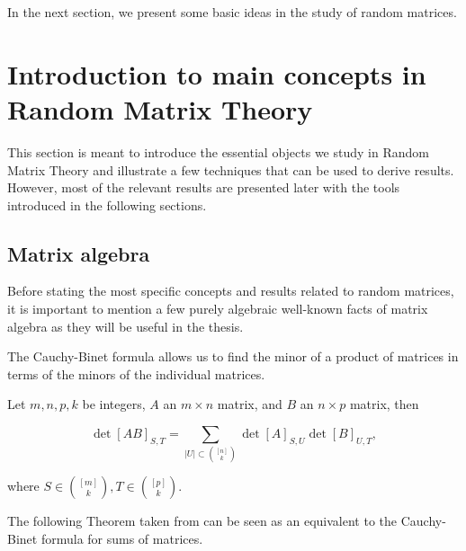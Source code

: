 In the next section, we present some basic ideas in the study of random matrices.

\section{Introduction to main concepts in Random Matrix Theory}

This section is meant to introduce the essential objects we study in Random Matrix Theory and illustrate a few techniques that can be used to derive results. However, most of the relevant results are presented later with the tools introduced in the following sections.



\subsection{Matrix algebra}

Before stating the most specific concepts and results related to random matrices, it is important to mention a few purely algebraic well-known facts of matrix algebra as they will be useful in the thesis.

The Cauchy-Binet formula allows us to find the minor of a product of matrices in terms of the minors of the individual matrices.

\begin{theorem} \label{thm:cauchy_binet}
    Let $m,n,p,k$ be integers, $A$ an $m\times n$ matrix, and $B$ an $n\times p$ matrix, then

    \begin{equation*}
        \det[AB]_{S,T} = \sum_{|U|\subset \binom{[n]}{k}} \det[A]_{S,U} \det[B]_{U,T},
    \end{equation*}

    \noindent where $S\in \binom{[m]}{k}, T \in \binom{[p]}{k}$.
\end{theorem}

The following Theorem taken from \cite{article:finitefree} can be seen as an equivalent to the Cauchy-Binet formula for sums of matrices.

